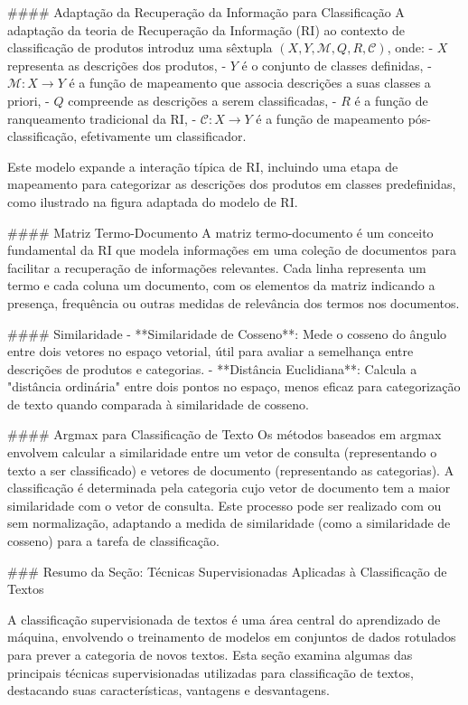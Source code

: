 {#### Adaptação da Recuperação da Informação para Classificação
A adaptação da teoria de Recuperação da Informação (RI) ao contexto de classificação de produtos introduz uma sêxtupla \((X, Y, \mathcal{M}, Q, R, \mathcal{C})\), onde:
- \(X\) representa as descrições dos produtos,
- \(Y\) é o conjunto de classes definidas,
- \(\mathcal{M}: X \to Y\) é a função de mapeamento que associa descrições a suas classes a priori,
- \(Q\) compreende as descrições a serem classificadas,
- \(R\) é a função de ranqueamento tradicional da RI,
- \(\mathcal{C}: X \to Y\) é a função de mapeamento pós-classificação, efetivamente um classificador.

Este modelo expande a interação típica de RI, incluindo uma etapa de mapeamento para categorizar as descrições dos produtos em classes predefinidas, como ilustrado na figura adaptada do modelo de RI.

#### Matriz Termo-Documento
A matriz termo-documento é um conceito fundamental da RI que modela informações em uma coleção de documentos para facilitar a recuperação de informações relevantes. Cada linha representa um termo e cada coluna um documento, com os elementos da matriz indicando a presença, frequência ou outras medidas de relevância dos termos nos documentos.

#### Similaridade
- **Similaridade de Cosseno**: Mede o cosseno do ângulo entre dois vetores no espaço vetorial, útil para avaliar a semelhança entre descrições de produtos e categorias.
- **Distância Euclidiana**: Calcula a "distância ordinária" entre dois pontos no espaço, menos eficaz para categorização de texto quando comparada à similaridade de cosseno.

#### Argmax para Classificação de Texto
Os métodos baseados em argmax envolvem calcular a similaridade entre um vetor de consulta (representando o texto a ser classificado) e vetores de documento (representando as categorias). A classificação é determinada pela categoria cujo vetor de documento tem a maior similaridade com o vetor de consulta. Este processo pode ser realizado com ou sem normalização, adaptando a medida de similaridade (como a similaridade de cosseno) para a tarefa de classificação.

### Resumo da Seção: Técnicas Supervisionadas Aplicadas à Classificação de Textos

A classificação supervisionada de textos é uma área central do aprendizado de máquina, envolvendo o treinamento de modelos em conjuntos de dados rotulados para prever a categoria de novos textos. Esta seção examina algumas das principais técnicas supervisionadas utilizadas para classificação de textos, destacando suas características, vantagens e desvantagens.

}
